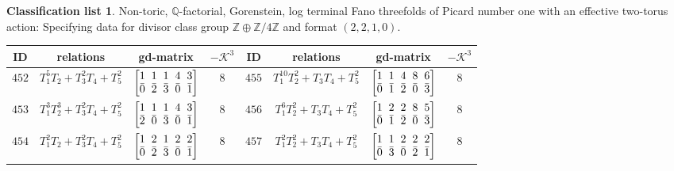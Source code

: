 \documentclass[pdftex]{sigma}%
\theoremstyle{definition}
\newtheorem{class-list}[thm]{Classification list}
\def\ZZ{{\mathbb Z}}
\def\QQ{{\mathbb Q}}
\numberwithin{equation}{section}
\begin{document}
\begin{class-list}\label{class-list(0,4)}
Non-toric, $\QQ$-factorial, Gorenstein, log terminal Fano
threefolds of Picard number one with an effective two-torus action:
Specifying data for divisor class group $\ZZ\oplus \ZZ/4\ZZ$ and
format $(2,2,1,0)$.
\begin{table}[h!]\centering\setlength{\tabcolsep}{3.5pt}
\renewcommand{\arraystretch}{1.35}\small\tabulinesep=1mm
\begin{tabu}{c|c|c|c||c|c|c|c}
\hline
ID&relations&gd-matrix&$-\mathcal{K}^3$&ID&relations&gd-matrix&$-\mathcal{K}^3$
\\
\hline
${452}$&${T_{1}^{5}T_{2}+T_{3}^{2}T_{4}+T_{5}^{2}}$
&$\arraycolsep=1mm\begin{bmatrix}{1} & {1} & {1} & {4} & {3} \\ {\bar{0}} & {\bar{2}} & {\bar{3}} & {\bar{0}} & {\bar{1}}\end{bmatrix}$&${8}$
&${455}$&${T_{1}^{10}T_{2}^{2}+T_{3}T_{4}+T_{5}^{2}}$
&$\arraycolsep=1mm\begin{bmatrix}{1} & {1} & {4} & {8} & {6} \\ {\bar{0}} & {\bar{1}} & {\bar{2}} & {\bar{0}} & {\bar{3}}\end{bmatrix}$&${8}$
\\
\hline
${453}$&${T_{1}^{3}T_{2}^{3}+T_{3}^{2}T_{4}+T_{5}^{2}}$
&$\arraycolsep=1mm\begin{bmatrix}{1} & {1} & {1} & {4} & {3} \\ {\bar{2}} & {\bar{0}} & {\bar{3}} & {\bar{0}} & {\bar{1}}\end{bmatrix}$&${8}$
&${456}$&${T_{1}^{6}T_{2}^{2}+T_{3}T_{4}+T_{5}^{2}}$
&$\arraycolsep=1mm\begin{bmatrix}{1} & {2} & {2} & {8} & {5} \\ {\bar{0}} & {\bar{1}} & {\bar{2}} & {\bar{0}} & {\bar{3}}\end{bmatrix}$&${8}$
\\
\hline
${454}$&${T_{1}^{2}T_{2}+T_{3}^{2}T_{4}+T_{5}^{2}}$
&$\arraycolsep=1mm\begin{bmatrix}{1} & {2} & {1} & {2} & {2} \\ {\bar{0}} & {\bar{2}} & {\bar{3}} & {\bar{0}} & {\bar{1}}\end{bmatrix}$&${8}$
&${457}$&${T_{1}^{2}T_{2}^{2}+T_{3}T_{4}+T_{5}^{2}}$
&$\arraycolsep=1mm\begin{bmatrix}{1} & {1} & {2} & {2} & {2} \\ {\bar{0}} & {\bar{3}} & {\bar{0}} & {\bar{2}} & {\bar{1}}\end{bmatrix}$&${8}$
\\
\hline
\end{tabu}\vspace{4mm}
\end{table}
\end{class-list}
\end{document}
